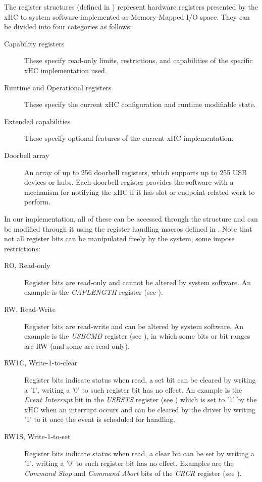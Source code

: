 The register structures (defined in )
represent hardware registers presented by the xHC to system software
implemented as Memory-Mapped I/O space. They can be divided into four categories as follows:
%
\begin{description}
	\item[Capability registers]
		These specify read-only limits, restrictions, and capabilities of the specific
		xHC implementation used.
	\item[Runtime and Operational registers]
		These specify the current xHC configuration and runtime modifiable state.
	\item[Extended capabilities]
		These specify optional features of the current xHC implementation.
	\item[Doorbell array]
		An array of up to 256 doorbell registers, which supports up to 255 USB devices
		or hubs. Each doorbell register provides the software with a mechanism for
		notifying the xHC if it has slot or endpoint-related work to perform.
\end{description}

In our implementation, all of these can be accessed through the  structure and
can be modified through it using the register handling macros defined in
. Note that not all register bits can be
manipulated freely by the system, some impose restrictions:
%
\begin{description}
	\item[RO, Read-only]
		Register bits are read-only and cannot be altered by system software. An example
		is the \textit{CAPLENGTH} register (see ).
	\item[RW, Read-Write]
		Register bits are read-write and can be altered by system software. An example
		is the \textit{USBCMD} register (see ), in which some bits or bit ranges
		are RW (and some are read-only).
	\item[RW1C, Write-1-to-clear]
		Register bits indicate status when read, a set bit can be cleared by writing
		a '1', writing a '0' to such register bit has no effect. An example is
		the \textit{Event Interrupt} bit in the \textit{USBSTS} register (see ) which is set
		to '1' by the xHC when an interrupt occurs and can be cleared by the driver
		by writing '1' to it once the event is scheduled for handling.
	\item[RW1S, Write-1-to-set]
		Register bits indicate status when read, a clear bit can be set by writing
		a '1', writing a '0' to such register bit has no effect. Examples are the
		\textit{Command Stop} and \textit{Command Abort} bits of the \textit{CRCR} register
		(see ).
\end{description}

